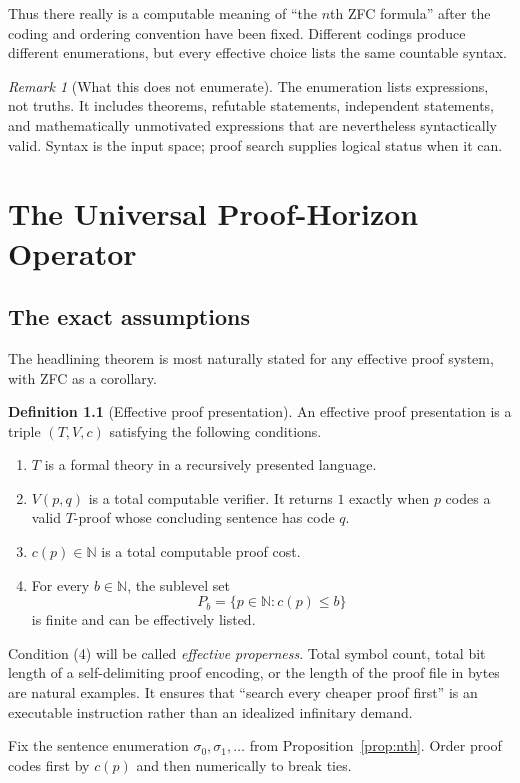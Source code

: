 \documentclass[11pt,oneside]{book}
\theoremstyle{definition}
\newtheorem{definition}[theorem]{Definition}
\theoremstyle{remark}
\newtheorem{remark}[theorem]{Remark}
\newcommand{\N}{\mathbb{N}}
\begin{document}
Thus there really is a computable meaning of ``the $n$th ZFC formula'' after the coding and ordering convention have been fixed. Different codings produce different enumerations, but every effective choice lists the same countable syntax.

\begin{remark}[What this does not enumerate]
The enumeration lists expressions, not truths. It includes theorems, refutable statements, independent statements, and mathematically unmotivated expressions that are nevertheless syntactically valid. Syntax is the input space; proof search supplies logical status when it can.
\end{remark}

\chapter{The Universal Proof-Horizon Operator}\label{ch:operator}
\section{The exact assumptions}
The headlining theorem is most naturally stated for any effective proof system, with ZFC as a corollary.

\begin{definition}[Effective proof presentation]\label{def:presentation}
An effective proof presentation is a triple $(T,V,c)$ satisfying the following conditions.
\begin{enumerate}[label=(\arabic*)]
\item $T$ is a formal theory in a recursively presented language.
\item $V(p,q)$ is a total computable verifier. It returns $1$ exactly when $p$ codes a valid $T$-proof whose concluding sentence has code $q$.
\item $c(p)\in\N$ is a total computable proof cost.
\item For every $b\in\N$, the sublevel set
\[
P_b=\{p\in\N:c(p)\le b\}
\]
is finite and can be effectively listed.
\end{enumerate}
Condition (4) will be called \emph{effective properness}. Total symbol count, total bit length of a self-delimiting proof encoding, or the length of the proof file in bytes are natural examples. It ensures that ``search every cheaper proof first'' is an executable instruction rather than an idealized infinitary demand.
\end{definition}

Fix the sentence enumeration $\sigma_0,\sigma_1,\ldots$ from Proposition~\ref{prop:nth}. Order proof codes first by $c(p)$ and then numerically to break ties.
\end{document}
